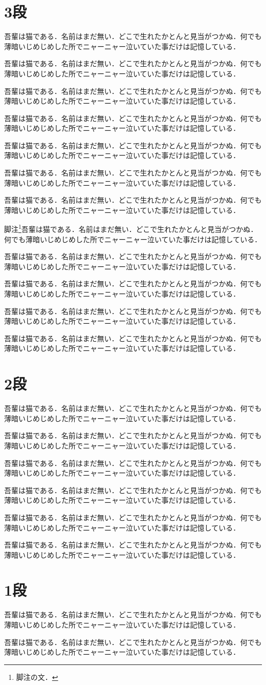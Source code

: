 \documentclass[fontsize=10pt]{jlreq}
\newcommand\para{吾輩は猫である．名前はまだ無い．どこで生れたかとんと見当がつかぬ．何でも薄暗いじめじめした所でニャーニャー泣いていた事だけは記憶している．\par}
\begin{document}
\section{3段}
\para\para\para\para\para\para\para 脚注\footnote{脚注の文．}\para\para\para\para\para
{}
\section{2段}
\para\para\para\para\para\para
\onecolumn
\section{1段}
\para\para
\end{document}
